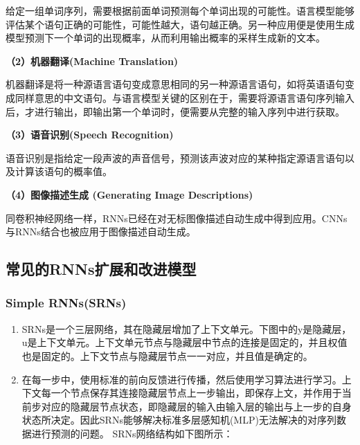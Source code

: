 ​
给定一组单词序列，需要根据前面单词预测每个单词出现的可能性。语言模型能够评估某个语句正确的可能性，可能性越大，语句越正确。另一种应用便是使用生成模型预测下一个单词的出现概率，从而利用输出概率的采样生成新的文本。

\textbf{（2）机器翻译(Machine Translation)}

​
机器翻译是将一种源语言语句变成意思相同的另一种源语言语句，如将英语语句变成同样意思的中文语句。与语言模型关键的区别在于，需要将源语言语句序列输入后，才进行输出，即输出第一个单词时，便需要从完整的输入序列中进行获取。

\textbf{（3）语音识别(Speech Recognition)}

​
语音识别是指给定一段声波的声音信号，预测该声波对应的某种指定源语言语句以及计算该语句的概率值。

\textbf{（4）图像描述生成 (Generating Image Descriptions)}

​
同卷积神经网络一样，RNNs已经在对无标图像描述自动生成中得到应用。CNNs与RNNs结合也被应用于图像描述自动生成。

\subsection{常见的RNNs扩展和改进模型}\label{ux5e38ux89c1ux7684rnnsux6269ux5c55ux548cux6539ux8fdbux6a21ux578b}

\subsubsection{Simple RNNs(SRNs)}\label{simple-rnnssrns}

\begin{enumerate}
\def\labelenumi{\arabic{enumi}.}
\item
  SRNs是一个三层网络，其在隐藏层增加了上下文单元。下图中的y是隐藏层，u是上下文单元。上下文单元节点与隐藏层中节点的连接是固定的，并且权值也是固定的。上下文节点与隐藏层节点一一对应，并且值是确定的。
\item
  在每一步中，使用标准的前向反馈进行传播，然后使用学习算法进行学习。上下文每一个节点保存其连接隐藏层节点上一步输出，即保存上文，并作用于当前步对应的隐藏层节点状态，即隐藏层的输入由输入层的输出与上一步的自身状态所决定。因此SRNs能够解决标准多层感知机(MLP)无法解决的对序列数据进行预测的问题。
  SRNs网络结构如下图所示：
\end{enumerate}


